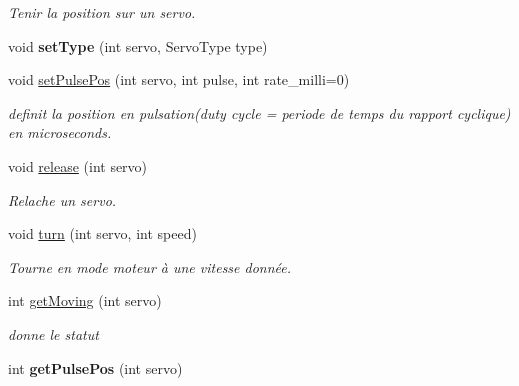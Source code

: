 \begin{DoxyCompactItemize}
\begin{DoxyCompactList}\small\item\em Tenir la position sur un servo. \end{DoxyCompactList}\item 
\mbox{\label{classServoDriver_abf685dbc27150bf205fd1e4fc8a7ed0d}} 
void {\bfseries set\+Type} (int servo, Servo\+Type type)
\item 
\mbox{\label{classServoDriver_a9122b024a721ff5c3701d9a0af5df385}} 
void \hyperlink{classServoDriver_a9122b024a721ff5c3701d9a0af5df385}{set\+Pulse\+Pos} (int servo, int pulse, int rate\+\_\+milli=0)
\begin{DoxyCompactList}\small\item\em definit la position en pulsation(duty cycle = periode de temps du rapport cyclique) en microseconds. \end{DoxyCompactList}\item 
\mbox{\label{classServoDriver_aa1040b0db7ed851aec70a122301fe665}} 
void \hyperlink{classServoDriver_aa1040b0db7ed851aec70a122301fe665}{release} (int servo)
\begin{DoxyCompactList}\small\item\em Relache un servo. \end{DoxyCompactList}\item 
\mbox{\label{classServoDriver_ad68ebde8a710451c8fea2cd03cfa4bc0}} 
void \hyperlink{classServoDriver_ad68ebde8a710451c8fea2cd03cfa4bc0}{turn} (int servo, int speed)
\begin{DoxyCompactList}\small\item\em Tourne en mode moteur à une vitesse donnée. \end{DoxyCompactList}\item 
int \hyperlink{classServoDriver_a0a8e84f0bbcff39549ddfc239f1a6237}{get\+Moving} (int servo)
\begin{DoxyCompactList}\small\item\em donne le statut \end{DoxyCompactList}\item 
\mbox{\label{classServoDriver_a716d64d7b2203c9cb8dff5c90d0a5dd9}} 
int {\bfseries get\+Pulse\+Pos} (int servo)
\item 

\end{DoxyCompactItemize}
